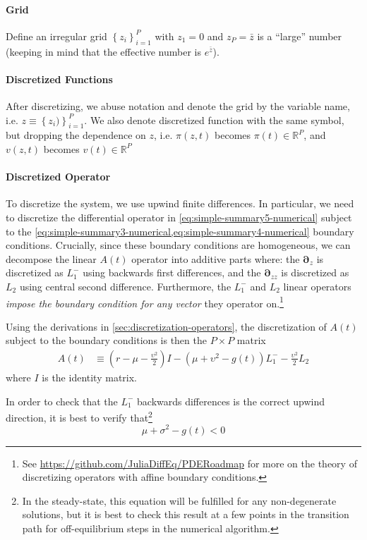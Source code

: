 \documentclass[11pt]{article}
\newcommand{\D}[1][]{\ensuremath{\boldsymbol{\partial}_{#1}}}
\newcommand{\R}{\ensuremath{\mathbb{R}}}
\newcommand{\set}[1]{\ensuremath{\left\{{#1}\right\}}}
\begin{document}
\paragraph{Grid}

Define an irregular grid $\set{z_i}_{i=1}^P$ with $z_1 = 0$ and $z_P = \bar{z}$ is a ``large'' number (keeping in mind that the effective number is $e^{\bar{z}}$). 

\paragraph{Discretized Functions}

After discretizing, we abuse notation and denote the grid by the variable name, i.e. $z \equiv \set{z_i)}_{i=1}^P$.  We also denote discretized function with the same symbol, but dropping the dependence on $z$, i.e. $\pi(z,t)$ becomes $\pi(t) \in \R^P$, and $v(z,t)$ becomes $v(t) \in \R^P$

\paragraph{Discretized Operator}

To discretize the system, we use upwind finite differences.  In particular, we need to discretize the differential operator in \cref{eq:simple-summary5-numerical} subject to the \cref{eq:simple-summary3-numerical,eq:simple-summary4-numerical} boundary conditions.  Crucially, since these boundary conditions are homogeneous, we can decompose the linear $A(t)$ operator into additive parts where: the $\D[z]$ is discretized as $L^{-}_1$ using backwards first differences, and the $\D[zz]$ is discretized as $L_2$ using central second difference.   Furthermore, the $L^{-}_1$ and $L_2$ linear operators \textit{impose the boundary condition for any vector} they operator on.\footnote{See \url{https://github.com/JuliaDiffEq/PDERoadmap} for more on the theory of discretizing operators with affine boundary conditions.}

Using the derivations in \cref{sec:discretization-operators}, the discretization of $A(t)$ subject to the boundary conditions is then the $P \times P$ matrix
\begin{align}
A(t) &\equiv \left(r - \mu - \frac{\upsilon^2}{2}\right) I - (\mu + \upsilon^2 - g(t)) L^{-}_1 - \frac{\upsilon^2}{2} L_2 \label{eq:A-def-simple}
\end{align}
where $I$ is the identity matrix.

In order to check that the  $L^{-}_1$ backwards differences is the correct upwind direction, it is best to verify that\footnote{In the steady-state, this equation will be fulfilled for any non-degenerate solutions, but it is best to check this result at a few points in the transition path for off-equilibrium steps in the numerical algorithm.}
\begin{equation}
\mu + \sigma^2 - g(t) < 0
\end{equation}
\end{document}
